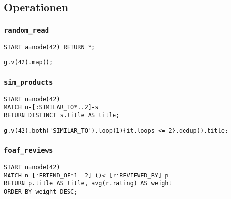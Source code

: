 \subsection{Operationen}
\label{anh:queries}

\subsubsection*{\texttt{random\_read}}

\begin{lstlisting}
START a=node(42) RETURN *;
\end{lstlisting}

\begin{lstlisting}
g.v(42).map();
\end{lstlisting}

\subsubsection*{\texttt{sim\_products}}

\begin{lstlisting}
START n=node(42) 
MATCH n-[:SIMILAR_TO*..2]-s 
RETURN DISTINCT s.title AS title;
\end{lstlisting}

\begin{lstlisting}
g.v(42).both('SIMILAR_TO').loop(1){it.loops <= 2}.dedup().title;
\end{lstlisting}

\subsubsection*{\texttt{foaf\_reviews}}

\begin{lstlisting}
START n=node(42)
MATCH n-[:FRIEND_OF*1..2]-()<-[r:REVIEWED_BY]-p
RETURN p.title AS title, avg(r.rating) AS weight
ORDER BY weight DESC;
\end{lstlisting}

